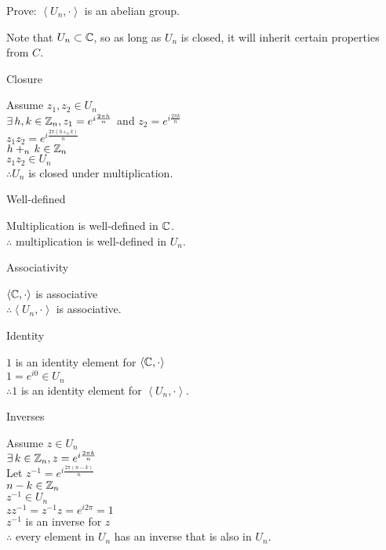 \documentclass[letterpaper,12pt,fleqn]{article}
\newcommand{\bas}[2]{\left<#1,#2\right>}
\begin{document}
\begin{example}
  Prove: $\bas{U_n}{\cdot}$ is an abelian group.

  Note that $U_n\subset\mathbb{C}$, so as long as $U_n$ is closed, it will inherit
  certain properties from $C$.

  \begin{description}
  \item Closure

    Assume $z_1,z_2\in U_n$ \\
    $\exists\,h,k\in\mathbb{Z}_n,z_1=e^{i\frac{2\pi h}{n}}$ and $z_2=e^{i\frac{2\pi k}{n}}$ \\
    $z_1z_2=e^{i\frac{2\pi(h+_n\,k)}{n}}$ \\
    $h+_n\,k\in\mathbb{Z}_n$ \\
    $z_1z_2\in U_n$ \\
    $\therefore U_n$ is closed under multiplication.

  \item Well-defined
    
    Multiplication is well-defined in $\mathbb{C}$. \\
    $\therefore$ multiplication is well-defined in $U_n$.

  \item Associativity

    $\bas{\C}{\cdot}$ is associative \\
    $\therefore \bas{U_n}{\cdot}$ is associative.

  \item Identity

    $1$ is an identity element for $\bas{\C}{\cdot}$ \\
    $1=e^{i0}\in U_n$ \\
    $\therefore 1$ is an identity element for $\bas{U_n}{\cdot}$.

  \item Inverses

    Assume $z\in U_n$ \\
    $\exists\,k\in\mathbb{Z}_n,z=e^{i\frac{2\pi k}{n}}$ \\
    Let $z^{-1}=e^{i\frac{2\pi(n-k)}{n}}$ \\
    $n-k\in\mathbb{Z}_n$ \\
    $z^{-1}\in U_n$ \\
    $zz^{-1}=z^{-1}z=e^{i2\pi}=1$ \\
    $z^{-1}$ is an inverse for $z$ \\
    $\therefore$ every element in $U_n$ has an inverse that is also in $U_n$.


\end{description}
\end{example}
\end{document}
